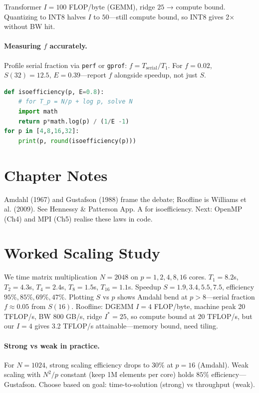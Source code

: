 \begin{remark} Transformer $I=100$ FLOP/byte (GEMM), ridge $25$ → compute bound. Quantizing to INT8 halves $I$ to $50$—still compute bound, so INT8 gives 2× without BW hit.
\end{remark}



\paragraph{Measuring $f$ accurately.} Profile serial fraction via \texttt{perf} or \texttt{gprof}: $f = T_{\text{serial}}/T_1$. For $f=0.02$, $S(32)=12.5$, $E=0.39$—report $f$ alongside speedup, not just $S$.

\begin{lstlisting}[language=Python,caption={Isoefficiency calculator.}]
def isoefficiency(p, E=0.8):
    # for T_p = N/p + log p, solve N
    import math
    return p*math.log(p) / (1/E -1)
for p in [4,8,16,32]:
    print(p, round(isoefficiency(p)))
\end{lstlisting}


\section{Chapter Notes}
Amdahl (1967) and Gustafson (1988) frame the debate; Roofline is Williams et al. (2009). See Hennessy \& Patterson App. A for isoefficiency. Next: OpenMP (Ch4) and MPI (Ch5) realise these laws in code.

\section{Worked Scaling Study}\label{sec:scaling-study}
We time matrix multiplication $N=2048$ on $p=1,2,4,8,16$ cores. $T_1=8.2$s, $T_2=4.3$s, $T_4=2.4$s, $T_8=1.5$s, $T_{16}=1.1$s. Speedup $S=1.9,3.4,5.5,7.5$, efficiency $95\%,85\%,69\%,47\%$. Plotting $S$ vs $p$ shows Amdahl bend at $p>8$—serial fraction $f\approx0.05$ from $S(16)$. Roofline: DGEMM $I=4$ FLOP/byte, machine peak 20 TFLOP/s, BW 800 GB/s, ridge $I^*=25$, so compute bound at 20 TFLOP/s, but our $I=4$ gives 3.2 TFLOP/s attainable—memory bound, need tiling.

\paragraph{Strong vs weak in practice.} For $N=1024$, strong scaling efficiency drops to $30\%$ at $p=16$ (Amdahl). Weak scaling with $N^2/p$ constant (keep 1M elements per core) holds $85\%$ efficiency—Gustafson. Choose based on goal: time-to-solution (strong) vs throughput (weak).

